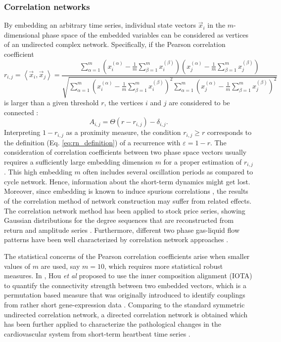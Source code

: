 		\subsubsection{Correlation networks}
		By embedding an arbitrary time series, individual state vectors $\vec{x}_i$ in the $m$-dimensional phase space of the embedded variables can be considered as vertices of an undirected complex network. Specifically, if the Pearson correlation coefficient 
\begin{equation}
r_{i,j} = \left<\vec{x}_i,\vec{x}_j\right>  = \frac{\sum_{\alpha=1}^m \left( x_i^{(\alpha)} - \frac{1}{m}\sum_{\beta=1}^m x_i^{(\beta)} \right)\left( x_j^{(\alpha)} - \frac{1}{m}\sum_{\beta=1}^m x_j^{(\beta)} \right)}{\sqrt{\sum_{\alpha=1}^m \left( x_i^{(\alpha)} - \frac{1}{m}\sum_{\beta=1}^m x_i^{(\beta)} \right)^2 \sum_{\alpha=1}^m \left( x_j^{(\alpha)} - \frac{1}{m}\sum_{\beta=1}^m x_j^{(\beta)} \right)^2}}
\end{equation}
is larger than a given threshold $r$, the vertices $i$ and $j$ are considered to be connected \cite{Yang2008,Gao2009}:
\begin{equation}
A_{i,j}=\Theta(r-r_{i,j})-\delta_{i,j}.
\end{equation}
Interpreting $1-r_{i,j}$ as a proximity measure, the condition $r_{i,j}\geq r$ corresponds to the definition (Eq. \eqref{eq:rn_definition}) of a recurrence with $\varepsilon=1-r$. The consideration of correlation coefficients between two phase space vectors usually requires a sufficiently large embedding dimension $m$ for a proper estimation of $r_{i,j}$. This high embedding $m$ often includes several oscillation periods as compared to cycle network. Hence, information about the short-term dynamics might get lost. Moreover, since embedding is known to induce spurious correlations \cite{thiel2006}, the results of the correlation method of network construction may suffer from related effects. The correlation network method has been applied to stock price series, showing Gaussian distributions for the degree sequences that are reconstructed from return and amplitude series \cite{Yang2008}. Furthermore, different two phase gas-liquid flow patterns have been well characterized by correlation network approaches \cite{Gao2009}. 

		The statistical concerns of the Pearson correlation coefficients arise when smaller values of $m$ are used, say $m = 10$, which requires more statistical robust measures. In \cite{Hou2014}, Hou {\textit{et al}} proposed to use the inner composition alignment (IOTA) to quantify the connectivity strength between two embedded vectors, which is a permutation based measure that was originally introduced to identify couplings from rather short gene-expression data \cite{Hempel2011}. Comparing to the standard symmetric undirected correlation network, a directed correlation network is obtained which has been further applied to characterize the pathological changes in the cardiovascular system from short-term heartbeat time series \cite{Hou2014}. 
			
